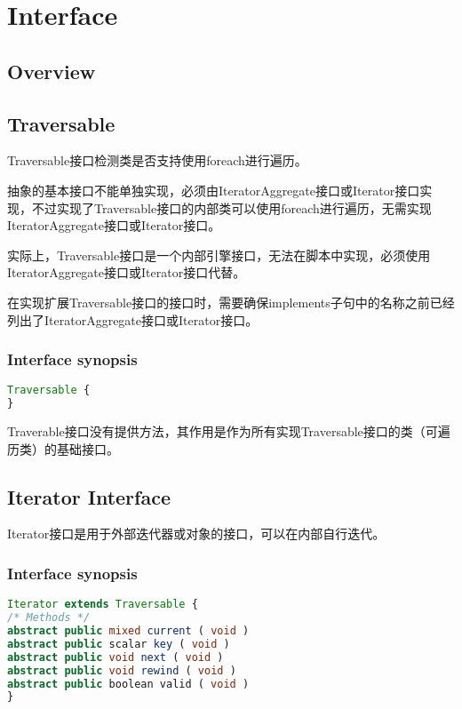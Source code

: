 \part{Interface}


\chapter{Overview}




\chapter{Traversable}

Traversable接口检测类是否支持使用foreach进行遍历。

抽象的基本接口不能单独实现，必须由IteratorAggregate接口或Iterator接口实现，不过实现了Traversable接口的内部类可以使用foreach进行遍历，无需实现IteratorAggregate接口或Iterator接口。

实际上，Traversable接口是一个内部引擎接口，无法在脚本中实现，必须使用IteratorAggregate接口或Iterator接口代替。

在实现扩展Traversable接口的接口时，需要确保implements子句中的名称之前已经列出了IteratorAggregate接口或Iterator接口。

\section{Interface synopsis}

\begin{lstlisting}[language=PHP]
Traversable {
}
\end{lstlisting}

Traverable接口没有提供方法，其作用是作为所有实现Traversable接口的类（可遍历类）的基础接口。


\chapter{Iterator Interface}

Iterator接口是用于外部迭代器或对象的接口，可以在内部自行迭代。

\section{Interface synopsis}


\begin{lstlisting}[language=PHP]
Iterator extends Traversable {
/* Methods */
abstract public mixed current ( void )
abstract public scalar key ( void )
abstract public void next ( void )
abstract public void rewind ( void )
abstract public boolean valid ( void )
}
\end{lstlisting}

